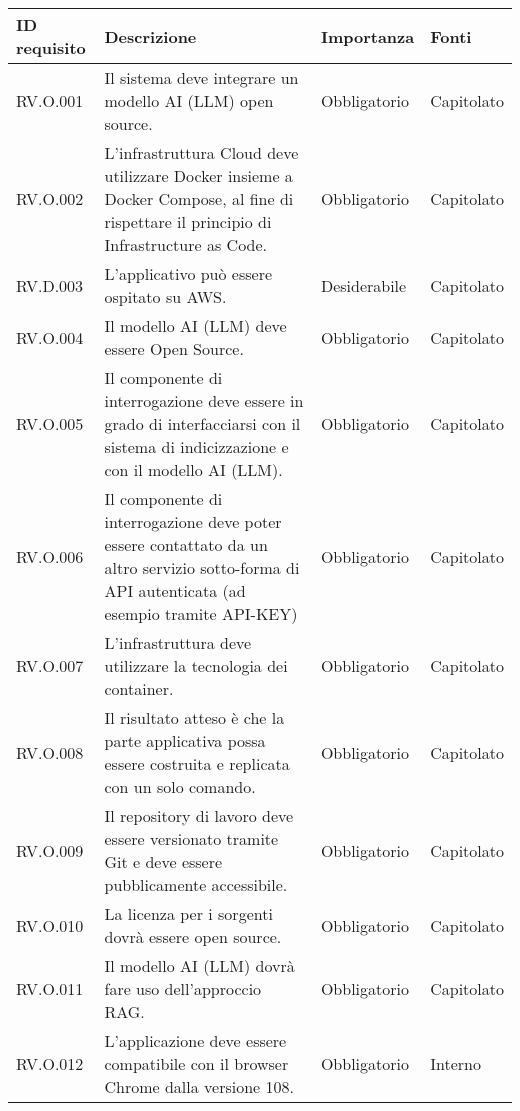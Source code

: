 
\begin{longtable}{|C{2.7cm}|L{7.2cm}|C{2.7cm}|C{2cm}|}
        \hline
    \textbf{ID requisito} & \textbf{Descrizione} & \textbf{Importanza} & \textbf{Fonti}  \\
    \hline
           RV.O.001 & Il sistema deve integrare un modello AI (LLM) open source. & Obbligatorio & Capitolato \\
          \hline 
          RV.O.002 & L’infrastruttura Cloud deve utilizzare Docker insieme a Docker Compose, al fine di rispettare il principio di Infrastructure as Code. & Obbligatorio & Capitolato \\
           \hline
          RV.D.003 & L'applicativo può essere ospitato su AWS. & Desiderabile & Capitolato \\
          \hline
          RV.O.004 & Il modello AI (LLM) deve essere Open Source.
         & Obbligatorio & Capitolato \\
        \hline
        RV.O.005 & Il componente di interrogazione deve essere in grado di interfacciarsi con il sistema di indicizzazione e con il modello AI (LLM).
         & Obbligatorio & Capitolato \\
        \hline
        RV.O.006 & Il componente di interrogazione deve poter essere contattato da un altro servizio sotto-forma di API autenticata (ad esempio tramite API-KEY)
         & Obbligatorio & Capitolato \\
        \hline
        RV.O.007 &  L’infrastruttura deve utilizzare la tecnologia dei container.
         & Obbligatorio & Capitolato \\
        \hline
         RV.O.008 & Il risultato atteso è che la parte applicativa possa essere costruita e replicata con un solo comando.
         & Obbligatorio & Capitolato \\
        \hline
        RV.O.009 & Il repository di lavoro deve essere versionato tramite Git e deve essere pubblicamente accessibile.
         & Obbligatorio & Capitolato \\
        \hline
        RV.O.010 & La licenza per i sorgenti dovrà essere open source.
         & Obbligatorio & Capitolato \\
        \hline
        RV.O.011 & Il modello AI (LLM) dovrà fare uso dell’approccio RAG.
         & Obbligatorio & Capitolato \\
        \hline
        RV.O.012 & L’applicazione deve essere compatibile con il browser Chrome dalla
        versione 108.
         & Obbligatorio & Interno \\

\end{longtable}

